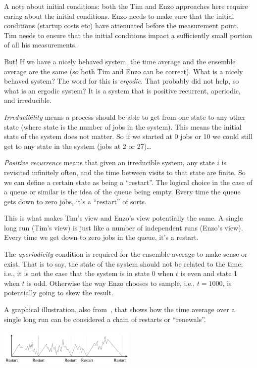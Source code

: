 \documentclass[a4paper]{report}
\begin{document}
A note about initial conditions: both the Tim and Enzo approaches here require caring about the initial conditions. Enzo needs to make sure that the initial conditions (startup costs etc) have attenuated before the measurement point. Tim needs to ensure that the initial conditions impact a sufficiently small portion of all his measurements.

But! If we have a nicely behaved system, the time average and the ensemble average are the same (so both Tim and Enzo can be correct). What is a nicely behaved system? The word for this is \textit{ergodic}. That probably did not help, so what is an ergodic system? It is a system that is positive recurrent, aperiodic, and irreducible.

\textit{Irreducibility} means a process should be able to get from one state to any other state (where state is the number of jobs in the system). This means the initial state of the system does not matter. So if we started at 0 jobs or 10 we could still get to any state in the system (jobs at 2 or 27)\ldots

\textit{Positive recurrence} means that given an irreducible system, any state $i$ is revisited infinitely often, and the time between visits to that state are finite. So we can define a certain state as being a ``restart''. The logical choice in the case of a queue or similar is the idea of the queue being empty. Every time the queue gets down to zero jobs, it's a ``restart'' of sorts. 

This is what makes Tim's view and Enzo's view potentially the same. A single long run (Tim's view) is just like a number of independent runs (Enzo's view). Every time we get down to zero jobs in the queue, it's a restart. 

The \textit{aperiodicity} condition is required for the ensemble average to make sense or exist. That is to say, the state of the system should not be related to the time; i.e., it is not the case that the system is in state 0 when $t$ is even and state 1 when $t$ is odd. Otherwise the way Enzo chooses to sample, i.e., $t = 1000$, is potentially going to skew the result.

A graphical illustration, also from~\cite{pmd}, that shows how the time average over a single long run can be considered a chain of restarts or ``renewals''.

\begin{center}
	\includegraphics[width=0.5\textwidth]{images/systemrestart.png}
\end{center}
\end{document}
